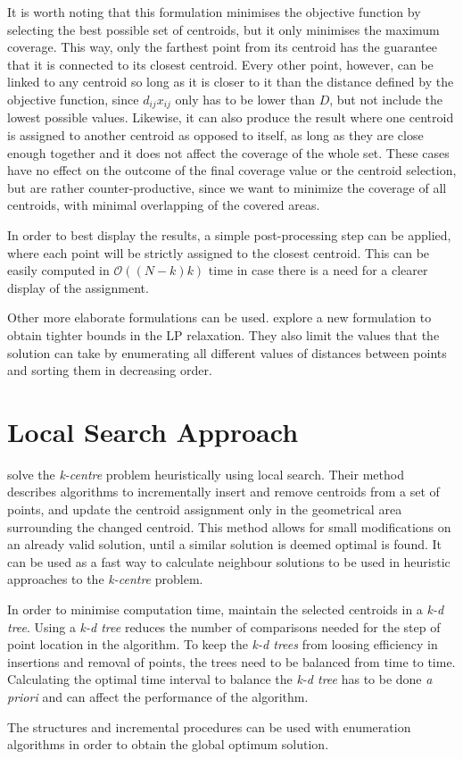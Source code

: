 It is worth noting that this formulation minimises the objective function by selecting the best possible set of centroids, but it only minimises the maximum coverage. This way, only the farthest point from its centroid has the guarantee that it is connected to its closest centroid.
Every other point, however, can be linked to any centroid so long as it is closer to it than the distance defined by the objective function, since $d_{ij}x_{ij}$ only has to be lower than $D$, but not include the lowest possible values.
Likewise, it can also produce the result where one centroid is assigned to another centroid as opposed to itself, as long as they are close enough together and it does not affect the coverage of the whole set.
These cases have no effect on the outcome of the final coverage value or the centroid selection, but are rather counter-productive, since we want to minimize the coverage of all centroids, with minimal overlapping of the covered areas.

In order to best display the results, a simple post-processing step can be applied, where each point will be strictly assigned to the closest centroid. This can be easily computed in $\mathcal{O}((N-k)k)$ time in case there is a need for a clearer display of the assignment.

Other more elaborate formulations can be used. \citet{linearprog} explore a new formulation to obtain tighter bounds in the LP relaxation. They also limit the values that the solution can take by enumerating all different values of distances between points and sorting them in decreasing order.

\section{Local Search Approach}
\citet{incrementalcov} solve the \emph{k-centre} problem heuristically using local search. Their method describes algorithms to incrementally insert and remove centroids from a set of points, and update the centroid assignment only in the geometrical area surrounding the changed centroid. This method allows for small modifications on an already valid solution, until a similar solution is deemed optimal is found. It can be used as a fast way to calculate neighbour solutions to be used in heuristic approaches to the \emph{k-centre} problem.

In order to minimise computation time, \citet{incrementalcov} maintain the selected centroids in a \emph{k-d tree}. Using a \emph{k-d tree} reduces the number of comparisons needed for the step of point location in the algorithm. To keep the \emph{k-d trees} from loosing efficiency in insertions and removal of points, the trees need to be balanced from time to time. Calculating the optimal time interval to balance the \emph{k-d tree} has to be done \emph{a priori} and can affect the performance of the algorithm.

The structures and incremental procedures can be used with enumeration algorithms in order to obtain the global optimum solution.